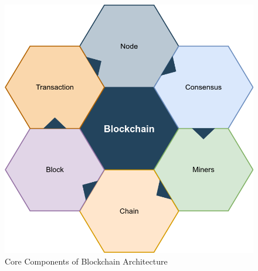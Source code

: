 \documentclass[10pt,final,journal,a4paper,oneside,twocolumn]{IEEEtran}
\begin{document}
\begin{enumerate}
\begin{enumerate}
					\end{enumerate}
					\begin{figure}[H]
						\includegraphics[width=\linewidth]{./Resources/core-components.png}
					    \caption{Core Components of Blockchain Architecture}
					\end{figure}
			\end{enumerate}
\end{document}
